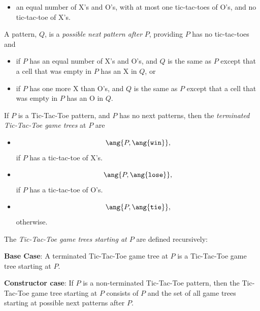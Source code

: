\begin{definition}
\begin{definition}
\begin{itemize}
\item an equal number of X's and O's, with at most one tic-tac-toes of
O's, and no tic-tac-toe of X's.
\end{itemize}
\fi

A pattern, $Q$, is a \emph{possible next pattern after} $P$, providing $P$
has no tic-tac-toes and
\begin{itemize}

\item if $P$ has an equal number of X's and O's, and $Q$ is the same as
$P$ except that a cell that was empty in $P$ has an X in $Q$, or

\item if $P$ has one more X than O's, and $Q$ is the same as $P$ except
that a cell that was empty in $P$ has an O in $Q$.
\end{itemize}

If $P$ is a Tic-Tac-Toe pattern, and $P$ has no next patterns, then the
\emph{terminated Tic-Tac-Toe game trees} at $P$ are

\begin{itemize}

\item 
\[
\ang{P, \ang{\texttt{win}}},
\]
if $P$ has a tic-tac-toe of X's.


\item 
\[
\ang{P, \ang{\texttt{lose}}},
\]
if $P$ has a tic-tac-toe of O's.


\item
\[
\ang{P, \ang{\texttt{tie}}},
\]
otherwise.

\end{itemize}

The \emph{Tic-Tac-Toe game trees starting at $P$} are defined recursively:

\textbf{Base Case}:
A terminated Tic-Tac-Toe game tree at $P$ is a Tic-Tac-Toe game tree
starting at $P$.

\textbf{Constructor case}: If $P$ is a non-terminated Tic-Tac-Toe pattern,
then the Tic-Tac-Toe game tree starting at $P$ consists of $P$ and the set
of all game trees starting at possible next patterns after $P$.
\end{definition}


\end{definition}
